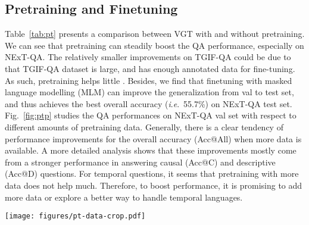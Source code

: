 \documentclass[runningheads]{llncs}
\newcommand{\ie}{\textit{i}.\textit{e}.}
\begin{document}
\subsection{Pretraining and Finetuning}
\label{sec:ptft}
Table~\ref{tab:pt} presents a comparison between VGT with and without pretraining. We can see that pretraining can steadily boost the QA performance, especially on NExT-QA. The relatively smaller improvements on TGIF-QA could be due to that TGIF-QA dataset is large, and has enough annotated data for fine-tuning. As such, pretraining helps little \cite{zoph2020rethinking}. Besides, we find that finetuning with masked language modelling (MLM) can improve the generalization from val to test set, and thus achieves the best overall accuracy (\ie~55.7\%) on NExT-QA test set. Fig.~\ref{fig:ptp} studies the QA performances on NExT-QA val set with respect to different amounts of pretraining data. Generally, there is a clear tendency of performance improvements for the overall accuracy (Acc@All) when more data is available. A more detailed analysis shows that these improvements mostly come from a stronger performance in answering causal (Acc@C) and descriptive (Acc@D) questions. For temporal questions, it seems that pretraining with more data does not help much. Therefore, 
to boost performance, it is promising to add more data or explore a better way to handle temporal languages. 

\begin{figure*}[t!]
  \begin{center}
    \texttt{[image: figures/pt-data-crop.pdf]}
  \end{center}
  \vspace{-0.6cm}
  \caption{Results of pretraining with different amounts of data.}
  \label{fig:ptp}
  \vspace{-0.2cm}
\end{figure*}
\end{document}
